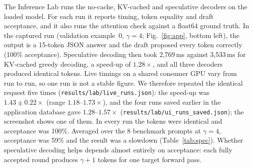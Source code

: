 The Inference Lab runs the no-cache, KV-cached and speculative decoders on the loaded model. For each run it
reports timing, token equality and draft acceptance, and it also runs the attention check against a float64
ground truth. In the captured run (validation example~0, $\gamma{=}4$; Fig.~\ref{fig:app}, bottom left), the
output is a 15-token JSON answer and the draft proposed every token correctly (100\% acceptance). Speculative
decoding then took 2{,}769\,ms against 3{,}533\,ms for KV-cached greedy decoding, a speed-up of
$1.28\times$, and all three decoders produced identical tokens. Live timings on a shared consumer GPU vary
from run to run, so one run is not a stable figure. We therefore repeated the identical request five times
(\texttt{results/lab/live\_runs.json}): the speed-up was $1.43\pm0.22\times$ (range $1.18$--$1.73\times$), and the
four runs saved earlier in the application database gave $1.28$--$1.57\times$ (\texttt{results/lab/ui\_runs\_saved.json});
the screenshot shows one of them. In every run the tokens were identical and acceptance was 100\%.
Averaged over the 8 benchmark prompts at $\gamma{=}4$, acceptance was 59\% and the result was a slowdown
(Table~\ref{tab:spec}). Whether speculative decoding helps depends almost entirely on acceptance: each fully
accepted round produces $\gamma{+}1$ tokens for one target forward pass.
